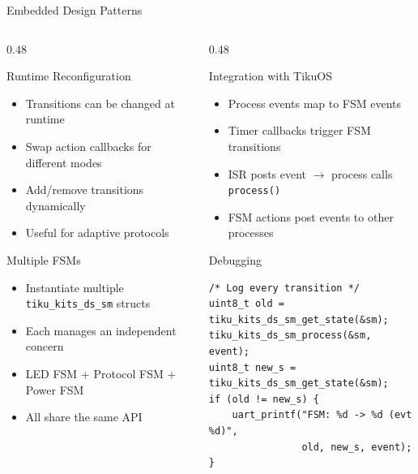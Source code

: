 \documentclass[aspectratio=169, 10pt]{beamer}
\begin{document}
\begin{frame}{Embedded Design Patterns}
\begin{columns}[T]
\begin{column}{0.48\textwidth}
\begin{block}{Runtime Reconfiguration}
\begin{itemize}
  \item Transitions can be changed at runtime
  \item Swap action callbacks for different modes
  \item Add/remove transitions dynamically
  \item Useful for adaptive protocols
\end{itemize}
\end{block}

\begin{block}{Multiple FSMs}
\begin{itemize}
  \item Instantiate multiple \texttt{tiku\_kits\_ds\_sm} structs
  \item Each manages an independent concern
  \item LED FSM + Protocol FSM + Power FSM
  \item All share the same API
\end{itemize}
\end{block}
\end{column}

\begin{column}{0.48\textwidth}
\begin{block}{Integration with TikuOS}
\begin{itemize}
  \item Process events map to FSM events
  \item Timer callbacks trigger FSM transitions
  \item ISR posts event $\rightarrow$ process calls \texttt{process()}
  \item FSM actions post events to other processes
\end{itemize}
\end{block}

\begin{block}{Debugging}
\begin{lstlisting}[style=cstyle, basicstyle=\ttfamily\tiny]
/* Log every transition */
uint8_t old = tiku_kits_ds_sm_get_state(&sm);
tiku_kits_ds_sm_process(&sm, event);
uint8_t new_s = tiku_kits_ds_sm_get_state(&sm);
if (old != new_s) {
    uart_printf("FSM: %d -> %d (evt %d)",
                old, new_s, event);
}
\end{lstlisting}
\end{block}
\end{column}
\end{columns}
\end{frame}
\end{document}
